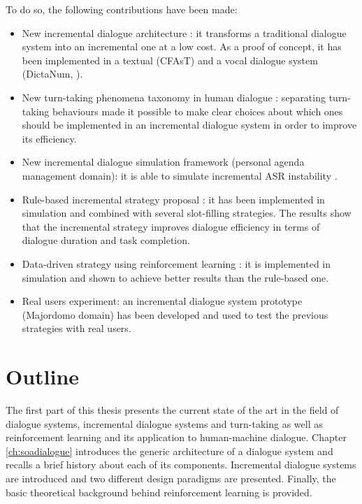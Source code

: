 				To do so, the following contributions have been made:
				
				\begin{itemize}
					\item New incremental dialogue architecture : it transforms a traditional dialogue system into an incremental one at a low cost. As a proof of concept, it has been implemented in a textual (CFAsT) and a vocal dialogue system (DictaNum, ).
					\item New turn-taking phenomena taxonomy in human dialogue : separating turn-taking behaviours made it possible to make clear choices about which ones should be implemented in an incremental dialogue system in order to improve its efficiency.
					\item New incremental dialogue simulation framework (personal agenda management domain): it is able to simulate incremental ASR instability .
					\item Rule-based incremental strategy proposal : it has been implemented in simulation and combined with several slot-filling strategies. The results show that the incremental strategy improves dialogue efficiency in terms of dialogue duration and task completion.
					\item Data-driven strategy using reinforcement learning : it is implemented in simulation and shown to achieve better results than the rule-based one.
					\item Real users experiment: an incremental dialogue system prototype (Majordomo domain) has been developed and used to test the previous strategies with real users.
				\end{itemize}
				
\section*{Outline}

				The first part of this thesis presents the current state of the art in the field of dialogue systems, incremental dialogue systems and turn-taking as well as reinforcement learning and its application to human-machine dialogue. Chapter \ref{ch:soadialogue} introduces the generic architecture of a dialogue system and recalls a brief history about each of its components. Incremental dialogue systems are introduced and two different design paradigms are presented. Finally, the basic theoretical background behind reinforcement learning is provided.
				
